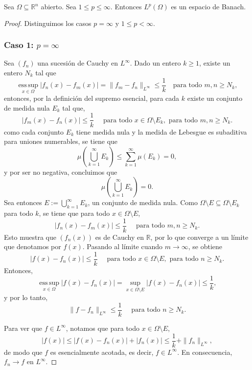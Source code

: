   Sea $\Omega \subseteq \mathbb{R}^n$ abierto. Sea $1 \leq p \leq \infty$. Entonces $L^p(\Omega)$ es un espacio de Banach.

  \begin{proof}
Distinguimos los casos \( p = \infty \) y \( 1 \leq p < \infty \).

\subsubsection*{Caso 1: \( p = \infty \)}

Sea \( (f_n) \) una sucesión de Cauchy en \( L^\infty \). Dado un entero \( k \geq 1 \), existe un entero \( N_k \) tal que
\[
\operatorname*{ess\,sup}_{x \in \Omega} |f_n(x) - f_m(x)| = \|f_m - f_n\|_{L^\infty} \leq \frac{1}{k} \quad \text{para todo } m, n \geq N_k,
\]
entonces, por la definición del supremo esencial, para cada \( k \) existe un conjunto de medida nula \( E_k \) tal que,
\[
|f_m(x) - f_n(x)| \leq \frac{1}{k} \quad \text{ para todo } x \in \Omega \setminus E_k, \text{ para todo } m, n \geq N_k.
\]
como cada conjunto \( E_k \) tiene medida nula y la medida de Lebesgue es subaditiva para uniones numerables, se tiene que
\[
\mu\left( \bigcup_{k=1}^\infty E_k \right) \leq \sum_{k=1}^\infty \mu(E_k) = 0,
\]
y por ser no negativa, concluimos que
\[
\mu\left( \bigcup_{k=1}^\infty E_k \right) = 0.
\]
Sea entonces \( E := \bigcup_{k=1}^\infty E_k \), un conjunto de medida nula. Como \( \Omega \setminus E \subseteq \Omega \setminus E_k \) para todo \( k \), se tiene que para todo \( x \in \Omega \setminus E \),
\[
|f_n(x) - f_m(x)| \leq \frac{1}{k} \quad \text{ para todo } m, n \geq N_k.
\]
Esto muestra que \( (f_n(x)) \) es de Cauchy en \( \mathbb{R} \), por lo que converge a un límite que denotamos por \( f(x) \). Pasando al límite cuando \( m \to \infty \), se obtiene
\[
|f(x) - f_n(x)| \leq \frac{1}{k} \quad \text{ para todo } x \in \Omega \setminus E, \text{ para todo } n \geq N_k.
\]
Entonces,
\[
\operatorname*{ess\,sup}_{x \in \Omega} |f(x) - f_n(x)| = \sup_{x \in \Omega \setminus E} |f(x) - f_n(x)| \leq \frac{1}{k},
\]
y por lo tanto,
\[
\|f - f_n\|_{L^\infty} \leq \frac{1}{k} \quad \text{ para todo } n \geq N_k.
\]

Para ver que \( f \in L^\infty \), notamos que para todo \( x \in \Omega \setminus E \),
\[
|f(x)| \leq |f(x) - f_n(x)| + |f_n(x)| \leq \frac{1}{k} + \|f_n\|_{L^\infty},
\]
de modo que \( f \) es esencialmente acotada, es decir, \( f \in L^\infty \). En consecuencia, \( f_n \to f \) en \( L^\infty \).


\end{proof}

